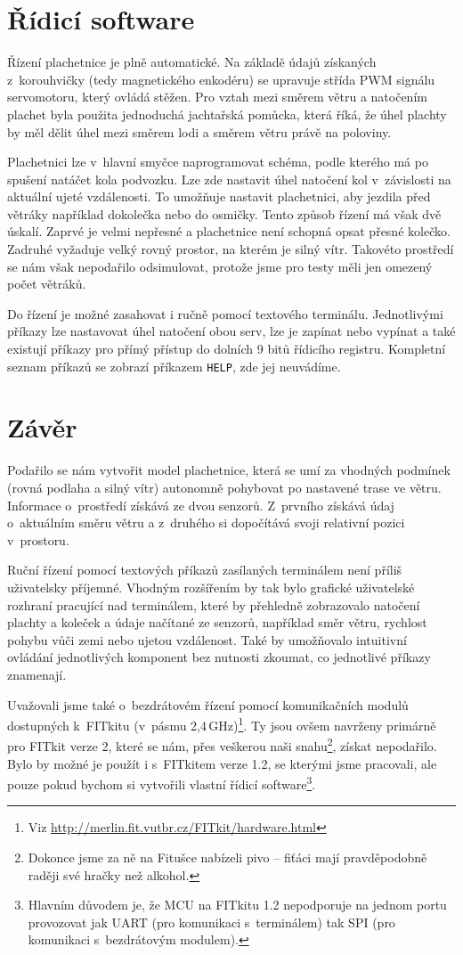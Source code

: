 \section{Řídicí software}
Řízení plachetnice je plně automatické. Na základě údajů získaných z~korouhvičky (tedy magnetického enkodéru) se upravuje střída PWM signálu servomotoru, který ovládá stěžen. Pro vztah mezi směrem větru a natočením plachet byla použita jednoduchá jachtařská pomůcka, která říká, že úhel plachty by měl dělit úhel mezi směrem lodi a směrem větru právě na poloviny.

Plachetnici lze v~hlavní smyčce naprogramovat schéma, podle kterého má po spušení natáčet kola podvozku. Lze zde nastavit úhel natočení kol v~závislosti na aktuální ujeté vzdálenosti. To umožňuje nastavit plachetnici, aby jezdila před větráky například dokolečka nebo do osmičky. Tento způsob řízení má však dvě úskalí. Zaprvé je velmi nepřesné a plachetnice není schopná opsat přesné kolečko. Zadruhé vyžaduje velký rovný prostor, na kterém je silný vítr. Takovéto prostředí se nám však nepodařilo odsimulovat, protože jsme pro testy měli jen omezený počet větráků.

Do řízení je možné zasahovat i ručně pomocí textového terminálu. Jednotlivými příkazy lze nastavovat úhel natočení obou serv, lze je zapínat nebo vypínat a také existují příkazy pro přímý přístup do dolních 9 bitů řídicího registru. Kompletní seznam příkazů se zobrazí příkazem \texttt{HELP}, zde jej neuvádíme.

\section{Závěr}
Podařilo se nám vytvořit model plachetnice, která se umí za vhodných podmínek (rovná podlaha a silný vítr) autonomně pohybovat po nastavené trase ve větru. Informace o~prostředí získává ze dvou senzorů. Z~prvního získává údaj o~aktuálním směru větru a z~druhého si dopočítává svoji relativní pozici v~prostoru.

Ruční řízení pomocí textových příkazů zasílaných terminálem není příliš uživatelsky příjemné. Vhodným rozšířením by tak bylo grafické uživatelské rozhraní pracující nad terminálem, které by přehledně zobrazovalo natočení plachty a koleček a údaje načítané ze senzorů, například směr větru, rychlost pohybu vůči zemi nebo ujetou vzdálenost. Také by umožňovalo intuitivní ovládání jednotlivých komponent bez nutnosti zkoumat, co jednotlivé příkazy znamenají.

Uvažovali jsme také o~bezdrátovém řízení pomocí komunikačních modulů dostupných k~FITkitu (v~pásmu 2,4\,GHz)\footnote{Viz \url{http://merlin.fit.vutbr.cz/FITkit/hardware.html}}. Ty jsou ovšem navrženy primárně pro FITkit verze 2, které se nám, přes veškerou naši snahu\footnote{Dokonce jsme za ně na Fitušce nabízeli pivo -- fiťáci mají pravděpodobně raději své hračky než alkohol.}, získat nepodařilo. Bylo by možné je použít i s~FITkitem verze 1.2, se kterými jsme pracovali, ale pouze pokud bychom si vytvořili vlastní řídicí software\footnote{Hlavním důvodem je, že MCU na FITkitu 1.2 nepodporuje na jednom portu provozovat jak UART (pro komunikaci s~terminálem) tak SPI (pro komunikaci s~bezdrátovým modulem).}.

